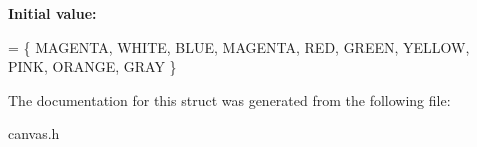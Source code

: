 {\bfseries Initial value\+:}
\begin{DoxyCode}
= \{
        MAGENTA, 
        WHITE,
        BLUE,
        MAGENTA,
        RED,
        GREEN,
        YELLOW,
        PINK,
        ORANGE,
        GRAY
    \}
\end{DoxyCode}


The documentation for this struct was generated from the following file\+:\begin{DoxyCompactItemize}
\item 
canvas.\+h\end{DoxyCompactItemize}
